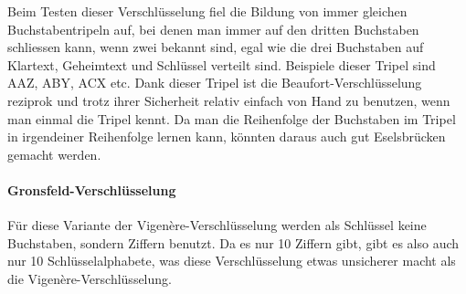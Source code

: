 Beim Testen dieser Verschlüsselung fiel die Bildung von immer gleichen Buchstabentripeln auf, bei denen man immer auf den dritten Buchstaben schliessen kann, wenn zwei bekannt sind, egal wie die drei Buchstaben auf Klartext, Geheimtext und Schlüssel verteilt sind. Beispiele dieser Tripel sind AAZ, ABY, ACX etc. Dank dieser Tripel ist die Beaufort-Verschlüsselung reziprok und trotz ihrer Sicherheit relativ einfach von Hand zu benutzen, wenn man einmal die Tripel kennt. Da man die Reihenfolge der Buchstaben im Tripel in irgendeiner Reihenfolge lernen kann, könnten daraus auch gut Eselsbrücken gemacht werden.


\paragraph{Gronsfeld-Verschlüsselung}
\label{sec:v-gronsfeld}
Für diese Variante der Vigenère-Verschlüsselung werden als Schlüssel keine Buchstaben, sondern Ziffern benutzt. Da es nur 10 Ziffern gibt, gibt es also auch nur 10 Schlüsselalphabete, was diese Verschlüsselung etwas unsicherer macht als die Vigenère-Verschlüsselung.

